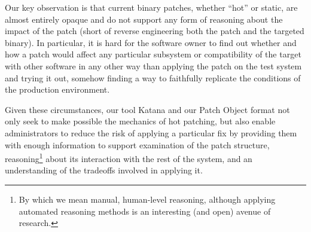 
Our key observation is that current binary patches, whether ``hot'' or
static, are almost entirely opaque and do not support any form of
reasoning about the impact of the patch (short of reverse engineering
both the patch and the targeted binary).  In particular, it is hard
for the software owner to find out whether and how a patch would
affect any particular subsystem or compatibility of the target with
other software in any other way than applying the patch on the test
system and trying it out, somehow finding a way to faithfully
replicate the conditions of the production environment.

Given these circumstances, our tool Katana and our Patch Object format
not only seek to make possible the mechanics of hot patching, but also
enable administrators to reduce the risk of applying a particular fix
by providing them with enough information to support examination of
the patch structure, reasoning\footnote{By which we mean manual,
  human-level reasoning, although applying automated reasoning methods
  is an interesting (and open) avenue of research.} about its
interaction with the rest of the system, and an understanding of the
tradeoffs involved in applying it.


